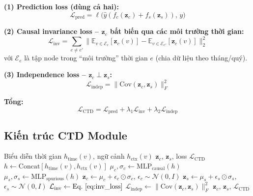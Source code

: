 \documentclass[12pt,a4paper]{article}
\begin{document}
\begin{mathbox}[title={Ba thành phần của CTD Loss}]
\textbf{(1) Prediction loss (dùng cả hai):}
\begin{equation}
  \mathcal{L}_\text{pred} = \ell\bigl(\hat{y}(f_c(\mathbf{z}_c) + f_s(\mathbf{z}_s)),\, y\bigr)
\end{equation}

\textbf{(2) Causal invariance loss -- $\mathbf{z}_c$ bất biến qua các môi trường thời gian:}
\begin{equation}
  \mathcal{L}_\text{inv} = \sum_{e \ne e'} \bigl\| \mathbb{E}_{v \in \mathcal{E}_e}[\mathbf{z}_c(v)] -
    \mathbb{E}_{v \in \mathcal{E}_{e'}}[\mathbf{z}_c(v)] \bigr\|_2^2
  \label{eq:inv_loss}
\end{equation}
với $\mathcal{E}_e$ là tập node trong ``môi trường'' thời gian $e$ 
(chia dữ liệu theo tháng/quý).

\textbf{(3) Independence loss -- $\mathbf{z}_c \perp \mathbf{z}_s$:}
\begin{equation}
  \mathcal{L}_\text{indep} = \bigl\| \text{Cov}(\mathbf{z}_c, \mathbf{z}_s) \bigr\|_F^2
  \label{eq:indep_loss}
\end{equation}

\textbf{Tổng:}
\begin{equation}
  \mathcal{L}_\text{CTD} = \mathcal{L}_\text{pred}
    + \lambda_1 \mathcal{L}_\text{inv}
    + \lambda_2 \mathcal{L}_\text{indep}
  \label{eq:ctd_total}
\end{equation}
\end{mathbox}

\subsection{Kiến trúc CTD Module}

\begin{algorithm}
\caption{Causal Temporal Disentanglement (CTD) Forward Pass}
\begin{algorithmic}[1]
\Require Biểu diễn thời gian $h_\text{time}(v)$, ngữ cảnh $h_\text{ctx}(v)$
\Ensure $\mathbf{z}_c$, $\mathbf{z}_s$, loss $\mathcal{L}_\text{CTD}$
\State $h \gets \text{Concat}[h_\text{time}(v), h_\text{ctx}(v)]$
\State $\mu_c, \sigma_c \gets \text{MLP}_\text{causal}(h)$
\State $\mu_s, \sigma_s \gets \text{MLP}_\text{spurious}(h)$
\State $\mathbf{z}_c \gets \mu_c + \epsilon_c \odot \sigma_c$, \quad $\epsilon_c \sim \mathcal{N}(0,I)$
\State $\mathbf{z}_s \gets \mu_s + \epsilon_s \odot \sigma_s$, \quad $\epsilon_s \sim \mathcal{N}(0,I)$
\State $\mathcal{L}_\text{inv} \gets \text{Eq.~\eqref{eq:inv_loss}}$ 
\State $\mathcal{L}_\text{indep} \gets \|\text{Cov}(\mathbf{z}_c, \mathbf{z}_s)\|_F^2$
\State \Return $\mathbf{z}_c$, $\mathbf{z}_s$, $\mathcal{L}_\text{CTD}$
\end{algorithmic}
\end{algorithm}
\end{document}
